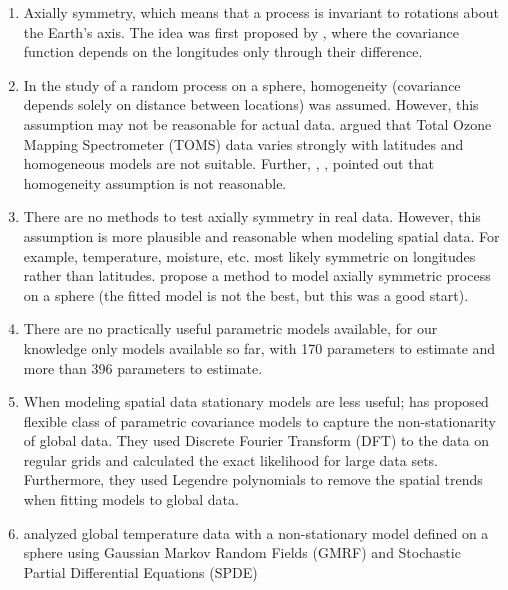 \begin{enumerate}

\item Axially symmetry, which means that a process is invariant to rotations about the Earth's axis. The idea was first proposed by \cite{Jones1963}, where the covariance function depends on the longitudes only through their difference.

\item In the study of a random process on a sphere, homogeneity (covariance depends solely on distance between locations) was assumed. However, this assumption may not be reasonable for actual data. \cite{Stein2007} argued that Total Ozone Mapping Spectrometer (TOMS) data varies strongly with latitudes and homogeneous models are not suitable. Further, \cite{CressieJohannesson2008}, \cite{JunStein2008}, \cite{BolinLindgren2011} pointed out that homogeneity assumption is not reasonable.   

\item There are no methods to test axially symmetry in real data. However, this assumption is more plausible and reasonable when modeling spatial data. For example, temperature, moisture, etc. most likely symmetric on longitudes rather than latitudes. \cite{Stein2007} propose a method to model axially symmetric process on a sphere (the fitted model is not the best, but this was a good start).

\item There are no practically useful parametric models available, for our knowledge only models available so far, \cite{stein1999} with 170 parameters to estimate and \cite{CressieJohannesson2008} more than 396 parameters to estimate.

\item When modeling spatial data stationary models are less useful;\cite{JunStein2008} has proposed flexible class of parametric covariance models to capture the non-stationarity of global data. They used Discrete Fourier Transform (DFT) to the data on regular grids and calculated the exact likelihood for large data sets. Furthermore, they used Legendre polynomials to remove the spatial trends when fitting models to global data.

\item \cite{Lindgren2011} analyzed global temperature data with a non-stationary model defined on a sphere using Gaussian Markov Random Fields (GMRF) and Stochastic Partial Differential Equations (SPDE)


\end{enumerate}
